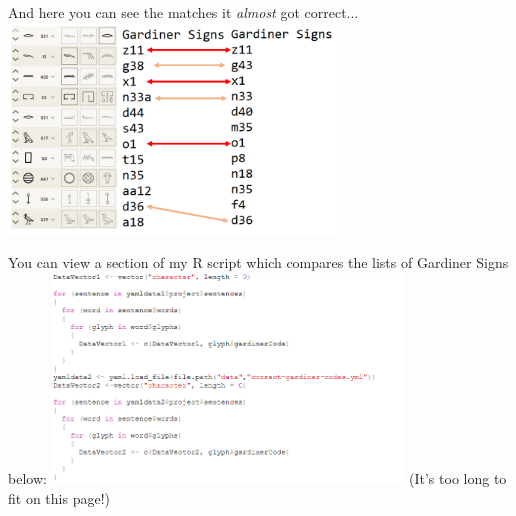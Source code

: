 \documentclass[unknownkeysallowed,usepdftitle=false, parskip=full, aspectratio=169]{beamer}
\newcommand{\secvariable}{nothing}
\begin{document}
\begin{frame}\label{\secvariable}

\begin{center}
And here you can see the matches it \textit{almost} got correct...
\includegraphics[width=0.65\textwidth,keepaspectratio]{figure/almost.PNG}
\end{center}

\end{frame}



\begin{frame}\label{\secvariable}

\begin{center}
You can view a section of my R script which compares the lists of Gardiner Signs below:
\includegraphics[width=0.7\textwidth,keepaspectratio]{figure/codecode.PNG}
\vfill
\tiny (It's too long to fit on this page!)

\end{center}

\end{frame}


\end{document}
